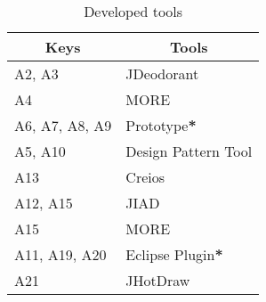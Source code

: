 \begin{table}[!htbp]
\caption{Developed tools}%
\label{tab-tools}
\begin{tabularx}{\textwidth}{X X}
\toprule%
\multicolumn{1}{c}{\textbf{Keys}}      &
\multicolumn{1}{c}{\textbf{Tools}}   \\      
\midrule%
A2, A3         & JDeodorant                   \\
A4             & MORE                         \\
A6, A7, A8, A9 & Prototype\textbf{*}          \\
A5, A10        & Design Pattern Tool          \\
A13            & Creios                       \\
A12, A15       & JIAD                         \\
A15            & MORE                         \\
A11, A19, A20  & Eclipse Plugin\textbf{*}     \\
A21            & JHotDraw                     \\
\bottomrule%
\end{tabularx}
\end{table}